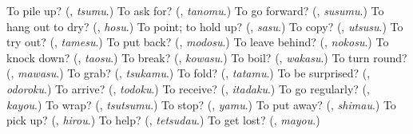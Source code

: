 \begin{tcolorbox}[breakable,colback=teal!4,colframe=teal!35!black,title={Before you move on}]
To pile up? (\textbf{}, \emph{tsumu}.) To ask for? (\textbf{}, \emph{tanomu}.) To go forward? (\textbf{}, \emph{susumu}.) To hang out to dry? (\textbf{}, \emph{hosu}.) To point; to hold up? (\textbf{}, \emph{sasu}.) To copy? (\textbf{}, \emph{utsusu}.) To try out? (\textbf{}, \emph{tamesu}.) To put back? (\textbf{}, \emph{modosu}.) To leave behind? (\textbf{}, \emph{nokosu}.) To knock down? (\textbf{}, \emph{taosu}.) To break? (\textbf{}, \emph{kowasu}.) To boil? (\textbf{}, \emph{wakasu}.) To turn round? (\textbf{}, \emph{mawasu}.) To grab? (\textbf{}, \emph{tsukamu}.) To fold? (\textbf{}, \emph{tatamu}.) To be surprised? (\textbf{}, \emph{odoroku}.) To arrive? (\textbf{}, \emph{todoku}.) To receive? (\textbf{}, \emph{itadaku}.) To go regularly? (\textbf{}, \emph{kayou}.) To wrap? (\textbf{}, \emph{tsutsumu}.) To stop? (\textbf{}, \emph{yamu}.) To put away? (\textbf{}, \emph{shimau}.) To pick up? (\textbf{}, \emph{hirou}.) To help? (\textbf{}, \emph{tetsudau}.) To get lost? (\textbf{}, \emph{mayou}.)
\end{tcolorbox}
